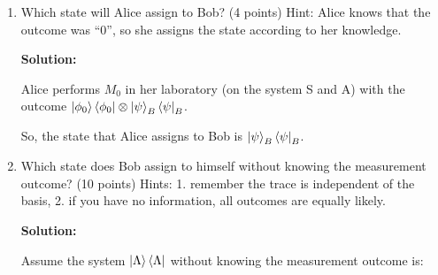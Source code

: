\documentclass[12pt]{article}
\begin{document}
\begin{enumerate}


    \item Which state will Alice assign to Bob? (4 points) Hint: Alice knows that the outcome was “0”, so she assigns the state according to her knowledge.



          \textbf{Solution:}

          Alice performs $M_0$ in her laboratory (on the system S and A) with the outcome $\ket{\phi_0}\bra{\phi_0}\otimes \ket{\psi}_B\bra{\psi}_B$.

          So, the state that Alice assigns to Bob is $\ket{\psi}_B\bra{\psi}_B$.


    \item Which state does Bob assign to himself without knowing the measurement outcome? (10 points) Hints: 1. remember the trace is independent of the basis, 2. if you have no information, all outcomes are equally likely.

          \textbf{Solution:}


          Assume the system $\ket{\Lambda}\bra{\Lambda}$ without knowing the measurement outcome is:


\end{enumerate}
\end{document}
